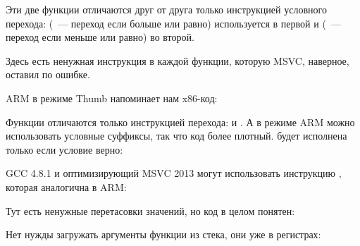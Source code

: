﻿






Эти две функции отличаются друг от друга только инструкцией условного перехода:
 (~--- переход если больше или равно) используется в первой
и  (~--- переход если меньше или равно) во второй.

\myindex{\CompilerAnomaly}
\label{MSVC_double_JMP_anomaly}
Здесь есть ненужная инструкция \JMP в каждой функции, которую MSVC, наверное, оставил по ошибке.


ARM в режиме Thumb напоминает нам x86-код:



Функции отличаются только инструкцией перехода:  и .
А в режиме ARM можно использовать условные суффиксы, так что код более плотный.
 будет исполнена только если условие верно:




\Optimizing GCC 4.8.1 и оптимизирующий MSVC 2013 
могут использовать инструкцию , которая аналогична  в ARM:






Тут есть ненужные перетасовки значений, но код в целом понятен:




Нет нужды загружать аргументы функции из стека, они уже в регистрах:

